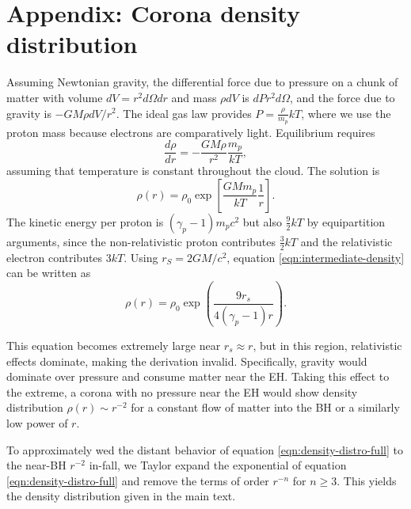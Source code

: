 \documentclass[twocolumn,twocolappendix]{aastex631}
\newcommand{\parens}[1]{\left(#1\right)}
\newcommand{\brackets}[1]{\left[#1\right]}
\begin{document}
\section*{Appendix: Corona density distribution}
\label{app:corona-density}
Assuming Newtonian gravity, the differential force due to pressure on a chunk of matter with volume $dV = r^2 d\Omega dr$ and mass $\rho dV$ is $dP r^2 d\Omega$, and the force due to gravity is $-GM\rho dV / r^2$. The ideal gas law provides $P = \frac{\rho}{m_p}kT$, where we use the proton mass because electrons are comparatively light. Equilibrium requires
\begin{equation}
  \frac{d\rho}{dr} = -\frac{GM\rho}{r^2}\frac{m_p}{kT},
\end{equation}
assuming that temperature is constant throughout the cloud. The solution is
\begin{equation}
  \rho(r) = \rho_0 \exp \brackets{\frac{GMm_p}{kT}\frac{1}{r}}.
  \label{eqn:intermediate-density}
\end{equation}
The kinetic energy per proton is $(\gamma_p-1) m_p c^2$ but also $\frac{9}{2}kT$ by equipartition arguments, since the non-relativistic proton contributes $\frac{3}{2}kT$ and the relativistic electron contributes $3kT$. Using $r_S = 2GM/c^2$, equation \ref{eqn:intermediate-density} can be written as
\begin{equation}
  \rho(r) = \rho_0 \exp \parens{\frac{9r_s}{4(\gamma_p-1) r}}.
  \label{eqn:density-distro-full}
\end{equation}

This equation becomes extremely large near $r_s \approx r$, but in this region, relativistic effects dominate, making the derivation invalid. Specifically, gravity would dominate over pressure and consume matter near the EH. Taking this effect to the extreme, a corona with no pressure near the EH would show density distribution $\rho(r) \sim r^{-2}$ for a constant flow of matter into the BH or a similarly low power of $r$.

To approximately wed the distant behavior of equation \ref{eqn:density-distro-full} to the near-BH $r^{-2}$ in-fall, we Taylor expand the exponential of equation \ref{eqn:density-distro-full} and remove the terms of order $r^{-n}$ for $n\geq 3$. This yields the density distribution given in the main text.

{}

\end{document}
